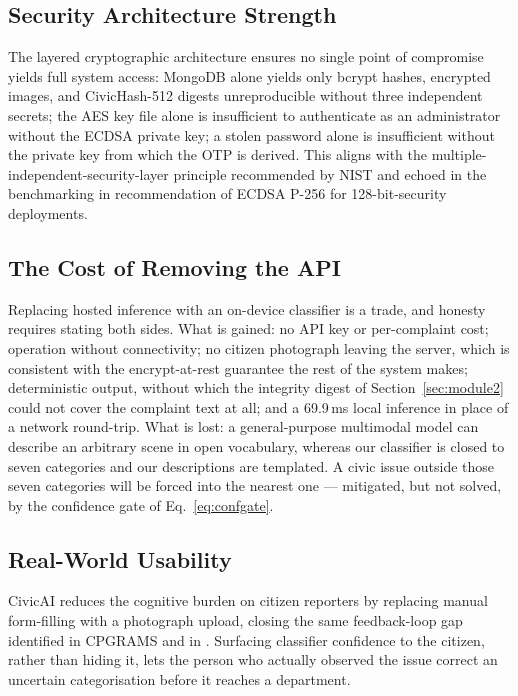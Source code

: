 \documentclass[conference]{IEEEtran}
\begin{document}
\subsection{Security Architecture Strength}
The layered cryptographic architecture ensures no single point of compromise yields full system access: MongoDB alone yields only bcrypt hashes, encrypted images, and CivicHash-512 digests unreproducible without three independent secrets; the AES key file alone is insufficient to authenticate as an administrator without the ECDSA private key; a stolen password alone is insufficient without the private key from which the OTP is derived. This aligns with the multiple-independent-security-layer principle recommended by NIST \cite{grassi2017nist} and echoed in the benchmarking in \cite{l19ecdsabenchmark} recommendation of ECDSA P-256 for 128-bit-security deployments.

\subsection{The Cost of Removing the API}
Replacing hosted inference with an on-device classifier is a trade, and honesty requires stating both sides. What is gained: no API key or per-complaint cost; operation without connectivity; no citizen photograph leaving the server, which is consistent with the encrypt-at-rest guarantee the rest of the system makes; deterministic output, without which the integrity digest of Section~\ref{sec:module2} could not cover the complaint text at all; and a 69.9\,ms local inference in place of a network round-trip. What is lost: a general-purpose multimodal model can describe an arbitrary scene in open vocabulary, whereas our classifier is closed to seven categories and our descriptions are templated. A civic issue outside those seven categories will be forced into the nearest one --- mitigated, but not solved, by the confidence gate of Eq.~\ref{eq:confgate}.

\subsection{Real-World Usability}
CivicAI reduces the cognitive burden on citizen reporters by replacing manual form-filling with a photograph upload, closing the same feedback-loop gap identified in CPGRAMS \cite{rao2019cpgrams} and in \cite{l13citysolution, l14civicconnect}. Surfacing classifier confidence to the citizen, rather than hiding it, lets the person who actually observed the issue correct an uncertain categorisation before it reaches a department.
\end{document}
